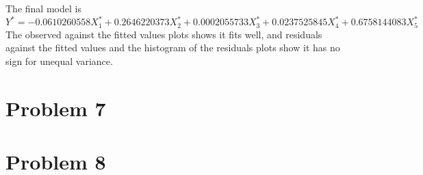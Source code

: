 \documentclass{article}\usepackage[]{graphicx}\usepackage[]{color}
\newenvironment{knitrout}{}{} %
\begin{document}
\begin{enumerate}[(a)]
\begin{knitrout}
\end{knitrout}

\qquad The final model is $$Y^* =  -0.0610260558 X_1^* + 0.2646220373 X_2^* + 0.0002055733 X_3^* + 0.0237525845 X_4^* +0.6758144083 X_5^* $$
\qquad The observed against the fitted values plots shows it fits well, and residuals against the fitted values and the histogram of the residuals plots show it has no sign for unequal variance.

\end{enumerate}

\section{Problem 7}

\section{Problem 8}
\end{document}
